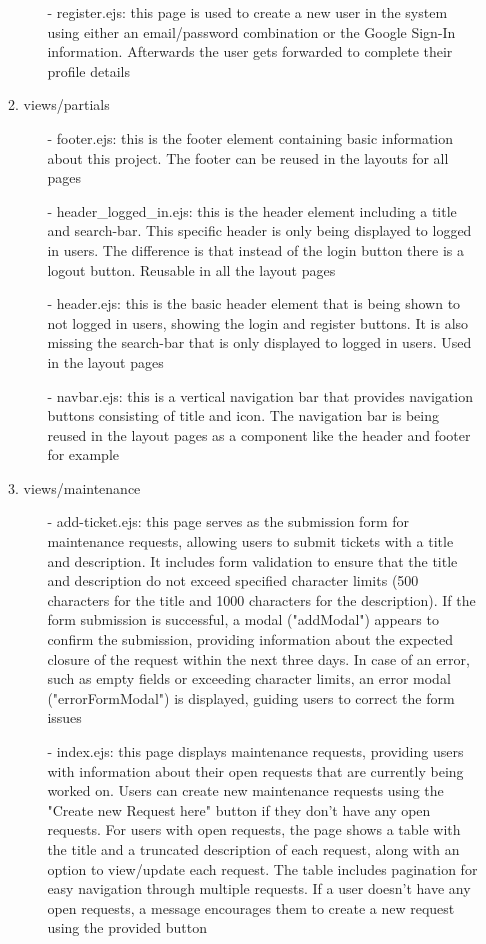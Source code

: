 \documentclass[conference]{IEEEtran}
\begin{document}
\begin{enumerate}
\begin{enumerate}
\begin{itemize}
                    \item[-] register.ejs: this page is used to create a new user in the system using either an email/password combination or the Google Sign-In information. Afterwards the user gets forwarded to complete their profile details
                \end{itemize}
            \item views/partials
                \begin{itemize}
                    \item[-] footer.ejs: this is the footer element containing basic information about this project. The footer can be reused in the layouts for all pages
                    \item[-] header\_logged\_in.ejs: this is the header element including a title and search-bar. This specific header is only being displayed to logged in users. The difference is that instead of the login button there is a logout button. Reusable in all the layout pages
                    \item[-] header.ejs: this is the basic header element that is being shown to not logged in users, showing the login and register buttons. It is also missing the search-bar that is only displayed to logged in users. Used in the layout pages
                    \item[-] navbar.ejs: this is a vertical navigation bar that provides navigation buttons consisting of title and icon. The navigation bar is being reused in the layout pages as a component like the header and footer for example
                \end{itemize}
            \item views/maintenance
                \begin{itemize}
                    \item[-] add-ticket.ejs: this page serves as the submission form for maintenance requests, allowing users to submit tickets with a title and description. It includes form validation to ensure that the title and description do not exceed specified character limits (500 characters for the title and 1000 characters for the description). If the form submission is successful, a modal ("addModal") appears to confirm the submission, providing information about the expected closure of the request within the next three days. In case of an error, such as empty fields or exceeding character limits, an error modal ("errorFormModal") is displayed, guiding users to correct the form issues
                    \item[-] index.ejs: this page displays maintenance requests, providing users with information about their open requests that are currently being worked on. Users can create new maintenance requests using the "Create new Request here" button if they don't have any open requests. For users with open requests, the page shows a table with the title and a truncated description of each request, along with an option to view/update each request. The table includes pagination for easy navigation through multiple requests. If a user doesn't have any open requests, a message encourages them to create a new request using the provided button

\end{itemize}
\end{enumerate}
\end{enumerate}
\end{document}
